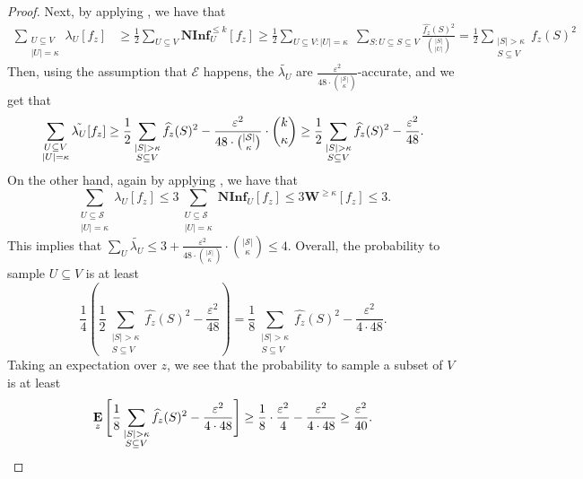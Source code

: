\documentclass[10pt,a4paper]{article}
\theoremstyle{plain}
\theoremstyle{remark}
\theoremstyle{plain}
\providecommand{\E}{}
\renewcommand{\E}{\mathop{\bf E\/}}
\providecommand{\W}{}
\renewcommand{\W}{\mathbf{W}}
\newcommand\NormInf{{\mathbf{NInf}}}
\newcommand{\eps}{\varepsilon}
\renewcommand{\hat}{\widehat}
\renewcommand{\tilde}{\widetilde}
\newcommand{\calE}{\mathcal{E}}
\newcommand{\calS}{\mathcal{S}}
\newcommand{\InfluentialCoords}{\calS}
\newcommand{\fourierCutoff}{\kappa}
\begin{document}
\begin{proof}
Next, by applying , we have that
\begin{align*}\sum_{\substack{U \subseteq V\\|U| = \fourierCutoff}}\lambda_U[f_z] &\geq \frac{1}{2}\sum_{U \subseteq V} \NormInf_U^{\leq k}[f_z] 
 \ge \frac{1}{2} \sum_{U \subseteq V:|U|=\fourierCutoff} \;\sum_{S: U \subseteq S \subseteq V} \frac{\hat{f_z}(S)^2}{\binom{|S|}{|U|}} = \frac{1}{2}\sum_{\substack{|S|>\fourierCutoff\\ S\subseteq V}}\hat{f_z}(S)^2
\end{align*}
Then, using the assumption that $\calE$ happens, the $\tilde{\lambda_U}$ are $\frac{\eps^2}{48\cdot\binom{|\InfluentialCoords|}{\fourierCutoff}}$-accurate, and we get that
$$\sum_{\substack{U \subseteq V\\|U| = \fourierCutoff}}\Tilde{\lambda_U}[f_z] \geq \frac{1}{2}\sum_{\substack{|S|>\fourierCutoff\\ S\subseteq V}}\hat{f_z}(S)^2 - \frac{\eps^2}{48\cdot\binom{|\InfluentialCoords|}{\fourierCutoff}}\cdot \binom{k}{\fourierCutoff} \geq \frac{1}{2}\sum_{\substack{|S|>\fourierCutoff\\ S\subseteq V}}\hat{f_z}(S)^2 - \frac{\eps^2}{48}.$$
On the other hand, again by applying , we have that
$$\sum_{\substack{U \subseteq\InfluentialCoords \\|U| = \fourierCutoff}}\lambda_U[f_z] \leq 3\sum_{\substack{U \subseteq\InfluentialCoords \\|U| = \fourierCutoff}}\NormInf_U[f_z] \leq 3\W^{\geq \fourierCutoff}[f_z] \leq 3. $$
This implies that $\sum_U \tilde{\lambda_U} \leq 3 + \frac{\eps^2}{48\cdot\binom{|\InfluentialCoords|}{\fourierCutoff}}\cdot \binom{|\InfluentialCoords|}{\fourierCutoff} \leq 4$. Overall, the probability to sample $U\subseteq V$ is at least 
$$\frac{1}{4}\left(\frac{1}{2}\sum_{\substack{|S|>\fourierCutoff\\ S\subseteq V}}\hat{f_z}(S)^2 - \frac{\eps^2}{48} \right ) = \frac{1}{8} \sum_{\substack{|S|>\fourierCutoff\\ S\subseteq V}}\hat{f_z}(S)^2 - \frac{\eps^2}{4\cdot48}.$$
Taking an expectation over $z$, we see that the probability to sample a subset of $V$ is at least 
\[\E_z \Bigg [\frac{1}{8} \sum_{\substack{|S|>\fourierCutoff\\ S\subseteq V}}\hat{f_z}(S)^2 - \frac{\eps^2}{4\cdot48}\Bigg ]\geq \frac{1}{8} \cdot \frac{\eps^2}{4} - \frac{\eps^2}{4\cdot 48} \geq \frac{\eps^2}{40}. \qedhere\]
\end{proof}
\end{document}

